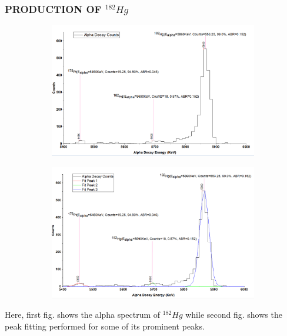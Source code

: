 \documentclass[12pt]{article}
\begin{document}
\subsubsection{PRODUCTION OF $^{182}Hg$}
\begin{figure}[h]
\centering
\begin{subfigure}
\centering
\includegraphics[scale=0.49]{Hg182.png}
\end{subfigure}
\hfill
\begin{subfigure}
\centering
\includegraphics[scale=0.49]{Hg182(Peak Fitting).png}
\end{subfigure}
\label{First fig shows the alpha spectrum of Hg 182 and second fig shows the peak fitting for its prominent peaks.}
\end{figure}
Here, first fig. shows the alpha spectrum of $^{182}Hg$ while second fig. shows the peak fitting performed for some of its prominent peaks.
\clearpage
\end{document}
